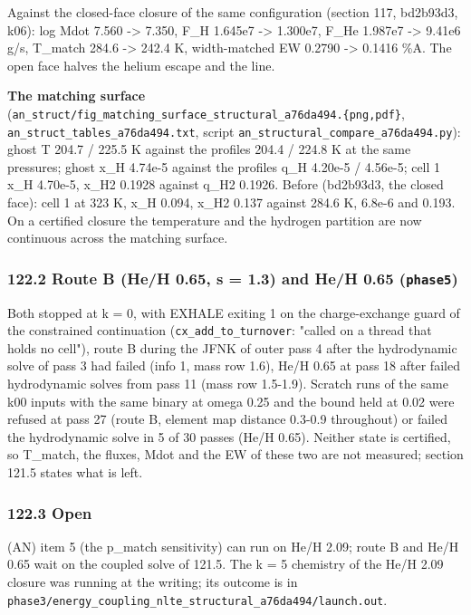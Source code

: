 \documentclass[english,a4paper]{my_memo}
\begin{document}
Against the closed-face closure of the same configuration (section 117,
bd2b93d3, k06): log Mdot 7.560 -\textgreater{} 7.350, F\_H 1.645e7 -\textgreater{} 1.300e7, F\_He
1.987e7 -\textgreater{} 9.41e6 g/s, T\_match 284.6 -\textgreater{} 242.4 K, width-matched EW 0.2790 -\textgreater{}
0.1416 \%A. The open face halves the helium escape and the line.

\textbf{The matching surface} (\texttt{an\_struct/fig\_matching\_surface\_structural\_a76da494.\{png,pdf\}},
\texttt{an\_struct\_tables\_a76da494.txt}, script \texttt{an\_structural\_compare\_a76da494.py}):
ghost T 204.7 / 225.5 K against the profile\textquotesingle s 204.4 / 224.8 K at the same
pressures; ghost x\_H 4.74e-5 against the profile\textquotesingle s q\_H 4.20e-5 / 4.56e-5;
cell 1 x\_H 4.70e-5, x\_H2 0.1928 against q\_H2 0.1926. Before (bd2b93d3, the
closed face): cell 1 at 323 K, x\_H 0.094, x\_H2 0.137 against 284.6 K, 6.8e-6
and 0.193. On a certified closure the temperature and the hydrogen partition
are now continuous across the matching surface.

\subsubsection{\texorpdfstring{122.2 Route B (He/H 0.65, s = 1.3) and He/H 0.65 (\texttt{phase5})}{122.2 Route B (He/H 0.65, s = 1.3) and He/H 0.65 (phase5)}}\label{1222-route-b-heh-065-s--13-and-heh-065-phase5}

Both stopped at k = 0, with EXHALE exiting 1 on the charge-exchange guard of
the constrained continuation (\texttt{cx\_add\_to\_turnover}: "called on a thread that
holds no cell"), route B during the JFNK of outer pass 4 after the
hydrodynamic solve of pass 3 had failed (info 1, mass row 1.6), He/H 0.65 at
pass 18 after failed hydrodynamic solves from pass 11 (mass row 1.5-1.9).
Scratch runs of the same k00 inputs with the same binary at omega 0.25 and the
bound held at 0.02 were refused at pass 27 (route B, element map distance
0.3-0.9 throughout) or failed the hydrodynamic solve in 5 of 30 passes (He/H
0.65). Neither state is certified, so T\_match, the fluxes, Mdot and the EW
of these two are not measured; section 121.5 states what is left.

\subsubsection{122.3 Open}\label{1223-open}

(AN) item 5 (the p\_match sensitivity) can run on He/H 2.09; route B and
He/H 0.65 wait on the coupled solve of 121.5. The k = 5 chemistry of the
He/H 2.09 closure was running at the writing; its outcome is in
\texttt{phase3/energy\_coupling\_nlte\_structural\_a76da494/launch.out}.
\end{document}
